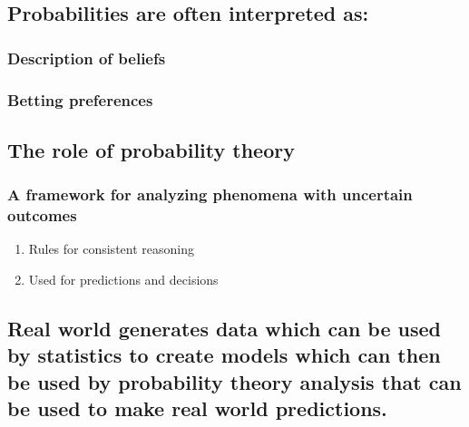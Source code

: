 \documentclass[11pt]{article}
\begin{document}
\subsection{Probabilities are often interpreted as:}
\label{sec:orgd34deb5}
\subsubsection{Description of beliefs}
\label{sec:orgfc3ef83}
\subsubsection{Betting preferences}
\label{sec:orgac3f887}
\subsection{The role of probability theory}
\label{sec:orgfebff79}
\subsubsection{A framework for analyzing phenomena with uncertain outcomes}
\label{sec:org4f9de17}
\begin{enumerate}
\item Rules for consistent reasoning
\label{sec:org207a71b}
\item Used for predictions and decisions
\label{sec:org489f500}
\end{enumerate}
\subsection{Real world generates data which can be used by statistics to create models which can then be used by probability theory analysis that can be used to make real world predictions.}
\label{sec:org8280931}
\end{document}
